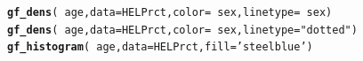 \documentclass[twoside]{book}\usepackage[]{graphicx}\usepackage[]{xcolor}
\makeatletter
\newcommand{\hlstr}[1]{\textcolor[rgb]{0.192,0.494,0.8}{#1}}%
\newcommand{\hlopt}[1]{\textcolor[rgb]{0,0,0}{#1}}%
\newcommand{\hlstd}[1]{\textcolor[rgb]{0.345,0.345,0.345}{#1}}%
\newcommand{\hlkwc}[1]{\textcolor[rgb]{0.333,0.667,0.333}{#1}}%
\newcommand{\hlkwd}[1]{\textcolor[rgb]{0.737,0.353,0.396}{\textbf{#1}}}%
\newenvironment{kframe}{%
 \def\at@end@of@kframe{}%
 \ifinner\ifhmode%
  \def\at@end@of@kframe{\end{minipage}}%
  \begin{minipage}{\columnwidth}%
 \fi\fi%
 \def\FrameCommand##1{\hskip\@totalleftmargin \hskip-\fboxsep
 \colorbox{shadecolor}{##1}\hskip-\fboxsep
     \hskip-\linewidth \hskip-\@totalleftmargin \hskip\columnwidth}%
 \MakeFramed {\advance\hsize-\width
   \@totalleftmargin\z@ \linewidth\hsize
   \@setminipage}}%
 {\par\unskip\endMakeFramed%
 \at@end@of@kframe}
\newenvironment{knitrout}{}{} %
\makeatother
\begin{document}
\begin{knitrout}
\color{fgcolor}\begin{kframe}
\begin{alltt}
\hlkwd{gf_dens}\hlstd{(} \hlopt{~}\hlstd{age,} \hlkwc{data} \hlstd{= HELPrct,} \hlkwc{color} \hlstd{=} \hlopt{~} \hlstd{sex,} \hlkwc{linetype} \hlstd{=} \hlopt{~} \hlstd{sex)}
\hlkwd{gf_dens}\hlstd{(} \hlopt{~}\hlstd{age,} \hlkwc{data} \hlstd{= HELPrct,} \hlkwc{color} \hlstd{=} \hlopt{~} \hlstd{sex,} \hlkwc{linetype} \hlstd{=} \hlstr{"dotted"}\hlstd{)}
\hlkwd{gf_histogram}\hlstd{(} \hlopt{~} \hlstd{age,} \hlkwc{data} \hlstd{= HELPrct,} \hlkwc{fill} \hlstd{=} \hlstr{'steelblue'}\hlstd{)}
\end{alltt}
\end{kframe}


\end{knitrout}
\end{document}
